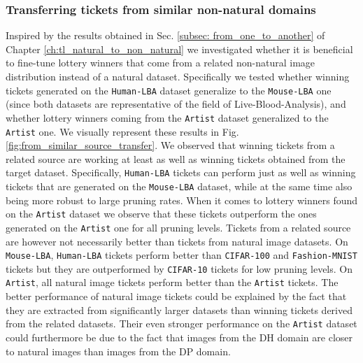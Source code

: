 

\subsubsection{Transferring tickets from similar non-natural domains}
Inspired by the results obtained in Sec. \ref{subsec: from_one_to_another} of Chapter \ref{ch:tl_natural_to_non_natural} we investigated whether it is beneficial to fine-tune lottery winners that come from a related non-natural image distribution instead of a natural dataset. Specifically we tested whether winning tickets generated on the \texttt{Human-LBA} dataset generalize to the \texttt{Mouse-LBA} one (since both datasets are representative of the field of Live-Blood-Analysis), and whether lottery winners coming from the \texttt{Artist}  dataset generalized to the \texttt{Artist}  one. We visually represent these results in Fig. \ref{fig:from_similar_source_transfer}. We observed that winning tickets from a related source are working at least as well as winning tickets obtained from the target dataset. Specifically, \texttt{Human-LBA} tickets can perform just as well as winning tickets that are generated on the \texttt{Mouse-LBA} dataset, while at the same time also being more robust to large pruning rates. When it comes to lottery winners found on the \texttt{Artist}  dataset we observe that these tickets outperform the ones generated on the \texttt{Artist}  one for all pruning levels. Tickets from a related source are however not necessarily better than tickets from natural image datasets. On \texttt{Mouse-LBA}, \texttt{Human-LBA} tickets perform better than \texttt{CIFAR-100} and \texttt{Fashion-MNIST} tickets but they are outperformed by \texttt{CIFAR-10} tickets for low pruning levels. On \texttt{Artist}, all natural image tickets perform better than the \texttt{Artist} tickets. The better performance of natural image tickets could be explained by the fact that they are extracted from significantly larger datasets than winning tickets derived from the related datasets. Their even stronger performance on the \texttt{Artist} dataset could furthermore be due to the fact that images from the DH domain are closer to natural images than images from the DP domain.


